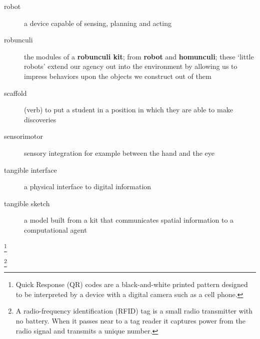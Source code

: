 \begin{description}
%
\item[robot] a device capable of sensing, planning and acting
%
\item[robunculi] the modules of a {\bf robunculi kit}; from {\bf robot} and {\bf homunculi}; these `little robots' extend our agency out into the environment by allowing us to impress behaviors upon the objects we construct out of them
%
\item[scaffold] (verb) to put a student in a position in which they are able to make discoveries
%
\item[sensorimotor] sensory integration for example between the hand and the eye
%
\item[tangible interface] a physical interface to digital information
%
\item[tangible sketch] a model built from a kit that communicates spatial information to a computational agent
%
\end{description}

\footnote{Quick Response (QR) codes are a black-and-white printed pattern designed to be interpreted by a device with a digital camera such as a cell phone.}

\footnote{A radio-frequency identification (RFID) tag is a small radio transmitter with no battery. When it passes near to a tag reader it captures power from the radio signal and transmits a unique number.}
